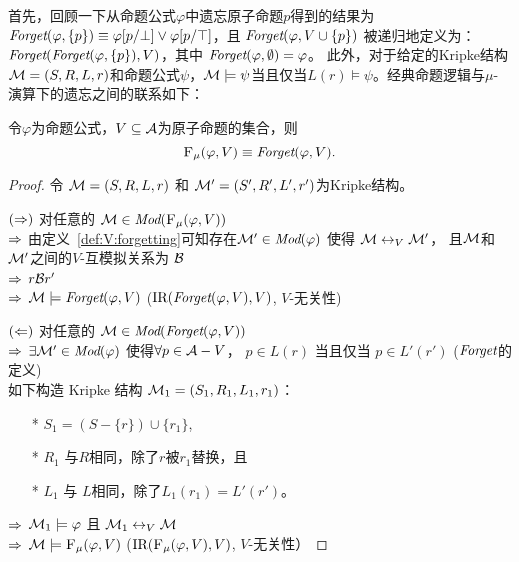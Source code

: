 首先，回顾一下从命题公式$\varphi$中遗忘原子命题$p$得到的结果为$\textit{Forget}(\varphi, \{p\})\equiv \varphi[p/\bot] \vee \varphi[p/\top]$，且 $\textit{Forget}(\varphi, V\cup \{p\})$ 被递归地定义为： $\textit{Forget}(\textit{Forget}(\varphi, \{p\}),V)$，其中 $\textit{Forget}(\varphi, \emptyset) = \varphi$。
此外，对于给定的Kripke结构${\cal M} = (S, R, L, r)$和命题公式$\psi$，${\cal M} \models  \psi$当且仅当$L(r) \models \psi$。经典命题逻辑与$\mu$-演算下的遗忘之间的联系如下：
\begin{theorem}\label{thm:PL:CTL}
	令$\varphi$为命题公式，$V\subseteq {\cal A}$为原子命题的集合，则
	\[
	{\textsc{F}_{\textsc{$\mu$}}}(\varphi, V) \equiv \textit{Forget}(\varphi, V).
	\]
\end{theorem}
\begin{proof}
	令 ${\cal M} = (S, R, L, r)$ 和 ${\cal M}' = (S', R', L', r')$为Kripke结构。
	
	$(\Rightarrow)$ 对任意的 ${\cal M} \in \textit{Mod}({\textsc{F}_{\textsc{$\mu$}}}(\varphi, V))$ \\
	$\Rightarrow$ 由定义~\ref{def:V:forgetting}可知存在${\cal M}' \in \textit{Mod}(\varphi)$ 使得 ${\cal M} \leftrightarrow_V {\cal M}'$， %
	 且${\cal M}$和${\cal M}'$之间的$V$-互模拟关系为 ${\cal B}$\\
	$\Rightarrow$ $r {\cal B} r'$ \\
	$\Rightarrow$ ${\cal M} \models \textit{Forget}(\varphi, V)$ \hfill ($\textrm{IR}(\textit{Forget}(\varphi, V),V)$, $V$-无关性)
	
	$(\Leftarrow)$ 对任意的 ${\cal M} \in \textit{Mod}(\textit{Forget}(\varphi, V))$ \\
	$\Rightarrow$ $\exists {\cal M}' \in\textit{Mod}(\varphi)$ 使得$\forall p \in {\cal A}-V$， $p \in L(r)$ 当且仅当 $p \in L'(r')$ \hfill ($\textit{Forget}$的定义)\\
	
	如下构造 Kripke 结构 ${\cal M}_1 = (S_1, R_1, L_1, r_1)$：
	\begin{itemize}
		\item[*] $S_1 = (S - \{r\}) \cup \{r_1\}$,
		\item[*] $R_1$ 与$R$相同，除了$r$被$r_1$替换，且
		\item[*] $L_1$ 与 $L$相同，除了$L_1(r_1) = L'(r')$。
	\end{itemize}
	$\Rightarrow$ ${\cal M}_1 \models \varphi$ 且 ${\cal M}_1 \leftrightarrow_V {\cal M}$\\
	$\Rightarrow$ ${\cal M} \models {\textsc{F}_{\textsc{$\mu$}}}(\varphi, V)$ \hfill ($\textrm{IR}({\textsc{F}_{\textsc{$\mu$}}}(\varphi, V), V)$, $V$-无关性）
\end{proof}

